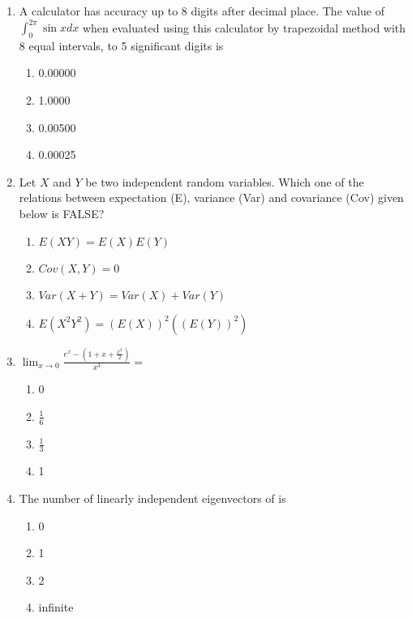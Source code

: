 \documentclass[journal]{IEEEtran}
\begin{document}
\begin{enumerate}
    \item A calculator has accuracy up to 8 digits after decimal place. The value of $\int_{0}^{2 \pi} \sin x d x$ when evaluated using this calculator by trapezoidal method with 8 equal intervals, to 5 significant digits is
\begin{multicols}{4}
 \begin{enumerate}
\item 0.00000
\item 1.0000
\item 0.00500
\item 0.00025
            \end{enumerate}
        \end{multicols}

    \item Let $X$ and $Y$ be two independent random variables. Which one of the relations between expectation (E), variance (Var) and covariance (Cov) given below is FALSE?
    \begin{multicols}{1}
            \begin{enumerate}
        \item $E(X Y)=E(X) E(Y)$
         \item $Cov(X,Y)=0$
         \item $Var(X+Y)=Var(X)+Var(Y)$
         \item $E(X^2Y^2)=(E(X))^2((E(Y))^2)$
            \end{enumerate}
        \end{multicols}

    \item $\lim _{x \rightarrow 0} \frac {e^{x}-\left(1+x+\frac{x^{2}}{2}\right)}{x^{3}}=$
    \begin{multicols}{4}
            \begin{enumerate}
              \item 0
              \item $\frac{1}{6}$
              \item $\frac{1}{3}$
              \item 1
            \end{enumerate}
        \end{multicols}
     
    \item The number of linearly independent eigenvectors of  is
    \begin{multicols}{4}
            \begin{enumerate}
              \item 0
              \item 1
              \item 2
              \item infinite
            \end{enumerate}
        \end{multicols}
    

\end{enumerate}
\end{document}
